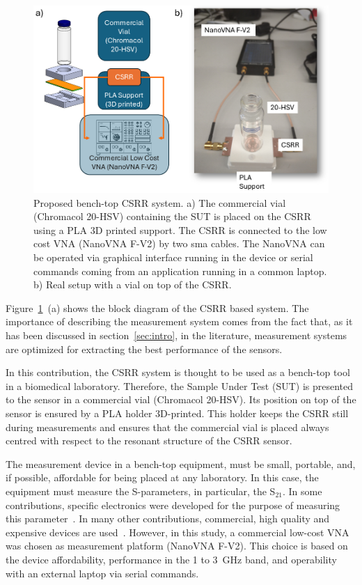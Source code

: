 \documentclass[journal,twoside,web]{ieeecolor}
\begin{document}
\begin{figure}[!t]
	\centering
	\includegraphics [trim = 0mm 0mm 0mm 0mm, clip, width=1\columnwidth]{figures/fig1.png}
	\caption{Proposed bench-top CSRR system. a) The commercial vial (Chromacol 20-HSV) containing the SUT is placed on the CSRR using a PLA 3D printed support. The CSRR is connected to the low cost VNA (NanoVNA F-V2) by two sma cables. The NanoVNA can be operated via graphical interface running in the device or serial commands coming from an application running in a common laptop. b) Real setup with a vial on top of the CSRR.}
	\label{fig:senBlockD}
	\vspace{-0.3cm}
\end{figure}

Figure~\ref{fig:senBlockD}~(a) shows the block diagram of the CSRR based system. The importance of describing the measurement system comes from the fact that, as it has been discussed in section~\ref{sec:intro}, in the literature, measurement systems are optimized for extracting the best performance of the sensors. 

In this contribution, the CSRR system is thought to be used as a bench-top tool in a biomedical laboratory. Therefore, the Sample Under Test (SUT) is presented to the sensor in a commercial vial (Chromacol 20-HSV). Its position on top of the sensor is ensured by a PLA holder 3D-printed. This holder keeps the CSRR still during measurements and ensures that the commercial vial is placed always centred with respect to the resonant structure of the CSRR sensor. 

The measurement device in a bench-top equipment, must be small, portable, and, if possible, affordable for being placed at any laboratory. In this case, the equipment must measure the S-parameters, in particular, the S$_{21}$. In some contributions, specific electronics were developed for the purpose of measuring this parameter~\cite{Omer2020, Omer2021}. In many other contributions, commercial, high quality and expensive devices are used~\cite{Patel2022, Jiang2023, Liu2024}. However, in this study, a commercial low-cost VNA was chosen as measurement platform (NanoVNA F-V2). This choice is based on the device  affordability, performance in the 1 to 3~GHz band, and operability with an external laptop via serial commands.
\end{document}
